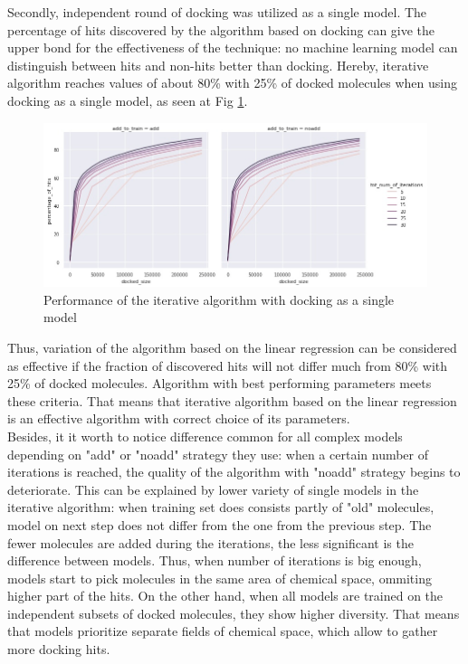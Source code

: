 Secondly, independent round of docking was utilized as a single model.
The percentage of hits discovered by the algorithm based on docking can give the upper bond for the effectiveness of the technique: no machine learning model can distinguish between hits and non-hits better than docking.
Hereby, iterative algorithm reaches values of about 80\% with 25\% of docked molecules when using docking as a single model, as seen at Fig \ref{docking}.\\

\begin{figure}[H]
    \centering
    \includegraphics[width = \linewidth]{Images/DockingIterations.jpg}
    \caption{Performance of the iterative algorithm with docking as a single model}
    \label{docking}
\end{figure}

Thus, variation of the algorithm based on the linear regression can be considered as effective if the fraction of discovered hits will not differ much from 80\% with 25\% of docked molecules. 
Algorithm with best performing parameters meets these criteria.
That means that iterative algorithm based on the linear regression is an effective algorithm with correct choice of its parameters.\\

Besides, it it worth to notice difference common for all complex models depending on "add" or "noadd" strategy they use: when a certain number of iterations is reached, the quality of the algorithm with "noadd" strategy begins to deteriorate.
This can be explained by lower variety of single models in the iterative algorithm: when training set does consists partly of "old" molecules, model on next step does not differ from the one from the previous step.
The fewer molecules are added during the iterations, the less significant is the difference between models.
Thus, when number of iterations is big enough, models start to pick molecules in the same area of chemical space, ommiting higher part of the hits.
On the other hand, when all models are trained on the independent subsets of docked molecules, they show higher diversity.
That means that models prioritize separate fields of chemical space, which allow to gather more docking hits.\\

